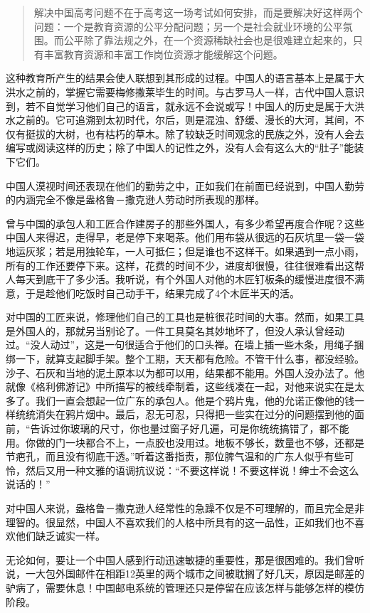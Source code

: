 \documentclass[12pt,oneside]{book}
\begin{document}
\begin{common-format}
\begin{quotation}
解决中国高考问题不在于高考这一场考试如何安排，而是要解决好这样两个问题：一个是教育资源的公平分配问题；另一个是社会就业环境的公平氛围。而公平除了靠法规之外，在一个资源稀缺社会也是很难建立起来的，只有丰富教育资源和丰富工作岗位资源才能缓解这个问题。
\end{quotation}

这种教育所产生的结果会使人联想到其形成的过程。中国人的语言基本上是属于大洪水之前的，掌握它需要梅修撒莱毕生的时间。与古罗马人一样，古代中国人意识到，若不自觉学习他们自己的语言，就永远不会说或写！中国人的历史是属于大洪水之前的。它可追溯到太初时代，尔后，则是混浊、舒缓、漫长的大河，其间，不仅有挺拔的大树，也有枯朽的草木。除了较缺乏时间观念的民族之外，没有人会去编写或阅读这样的历史；除了中国人的记性之外，没有人会有这么大的“肚子”能装下它们。 

中国人漠视时间还表现在他们的勤劳之中，正如我们在前面已经说到，中国人勤劳的内涵完全不像是盎格鲁－撒克逊人劳动时所表现的那样。 

曾与中国的承包人和工匠合作建房子的那些外国人，有多少希望再度合作呢？这些中国人来得迟，走得早，老是停下来喝茶。他们用布袋从很远的石灰坑里一袋一袋地运灰浆；若是用独轮车，一人可抵仨；但是谁也不这样干。如果遇到一点小雨，所有的工作还要停下来。这样，花费的时间不少，进度却很慢，往往很难看出这帮人每天到底干了多少活。我听说，有个外国人对他的木匠钉板条的缓慢进度很不满意，于是趁他们吃饭时自己动手干，结果完成了4个木匠半天的活。 

对中国的工匠来说，修理他们自己的工具也是桩很花时间的大事。然而，如果工具是外国人的，那就另当别论了。一件工具莫名其妙地坏了，但没人承认曾经动过。“没人动过”，这是一句很适合于他们的口头禅。在墙上插一些木条，用绳子捆绑一下，就算支起脚手架。整个工期，天天都有危险。不管干什么事，都没经验。沙子、石灰和当地的泥土原本以为都可以用，结果都不能用。外国人没办法了。他就像《格利佛游记》中所描写的被线牵制着，这些线凑在一起，对他来说实在是太多了。我们一直会想起一位广东的承包人。他是个鸦片鬼，他的允诺正像他的钱一样统统消失在鸦片烟中。最后，忍无可忍，只得把一些实在过分的问题摆到他的面前，“告诉过你玻璃的尺寸，你也量过窗子好几遍，可是你统统搞错了，都不能用。你做的门一块都合不上，一点胶也没用过。地板不够长，数量也不够，还都是节疤孔，而且没有彻底干透。”听着这番指责，那位脾气温和的广东人似乎有些可怜，然后又用一种文雅的语调抗议说：“不要这样说！不要这样说！绅士不会这么说话的！” 

对中国人来说，盎格鲁－撒克逊人经常性的急躁不仅是不可理解的，而且完全是非理智的。很显然，中国人不喜欢我们的人格中所具有的这一品性，正如我们也不喜欢他们缺乏诚实一样。 

无论如何，要让一个中国人感到行动迅速敏捷的重要性，那是很困难的。我们曾听说，一大包外国邮件在相距12英里的两个城市之间被耽搁了好几天，原因是邮差的驴病了，需要休息！中国邮电系统的管理还只是停留在应该怎样与能够怎样的模仿阶段。 


\end{common-format}
\end{document}

